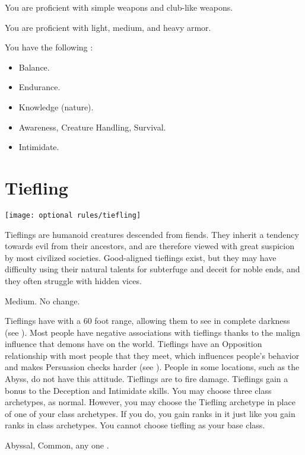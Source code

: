        You are proficient with simple weapons and club-like weapons.

        You are proficient with light, medium, and heavy armor.

        You have the following :
        \begin{itemize}
            \item {} Balance.
            \item {} Endurance.
            \item {} Knowledge (nature).
            \item {} Awareness, Creature Handling, Survival.
            \item {} Intimidate.
        \end{itemize}

\section{Tiefling}
    \texttt{[image: optional rules/tiefling]}

    Tieflings are humanoid creatures descended from fiends.
    They inherit a tendency towards evil from their ancestors, and are therefore viewed with great suspicion by most civilized societies.
    Good-aligned tieflings exist, but they may have difficulty using their natural talents for subterfuge and deceit for noble ends, and they often struggle with hidden vices.

     Medium.
     No change.
    \begin{itemize}
         Tieflings have  with a 60 foot range, allowing them to see in complete darkness (see ).
         Most people have negative associations with tieflings thanks to the malign influence that demons have on the world.
            Tieflings have an Opposition relationship with most people that they meet, which influences people's behavior and makes Persuasion checks harder (see ).
            People in some locations, such as the Abyss, do not have this attitude.
         Tieflings are  to fire damage.
         Tieflings gain a  bonus to the Deception and Intimidate skills.
         You may choose three class archetypes, as normal.
            However, you may choose the Tiefling archetype in place of one of your class archetypes.
            If you do, you gain ranks in it just like you gain ranks in class archetypes.
            You cannot choose tiefling as your base class.
    \end{itemize}
     Abyssal, Common, any one .

